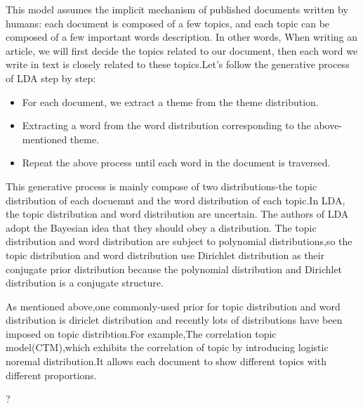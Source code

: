 This model assumes the implicit mechanism of published documents written by humans: each document is composed of a few topics, and each topic can be composed of a few important words description. In other words, When writing an article, we will first decide the topics related to our document, then each word we write in text is closely related to these topics.Let's follow the generative process of LDA step by step:
\begin{itemize}
  \item For each document, we extract a theme from the theme distribution.
  \item Extracting a word from the word distribution corresponding to the above-mentioned theme.
  \item Repeat the above process until each word in the document is traversed.
\end{itemize}

This generative process is mainly compose of two distributions-the topic distribution of each docuemnt and the word distribution of each topic.In LDA, the topic distribution and word distribution are uncertain. The authors of LDA adopt the Bayesian idea that they should obey a distribution. The topic distribution and word distribution are subject to  polynomial distributions,so the topic distribution and word distribution use Dirichlet distribution as their conjugate prior distribution because the polynomial distribution and Dirichlet distribution is a conjugate structure.

As mentioned above,one commonly-used prior for topic distribution and word distribution is diriclet distribution and recently lots of distributions have been imposed on topic distribtion.For example,The correlation topic model(CTM)\cite{A CORRELATED TOPIC MODEL OF SCIENCE},which exhibits the correlation of topic by introducing logistic noremal distribution.It allows each document to show different topics with different proportions.



?

